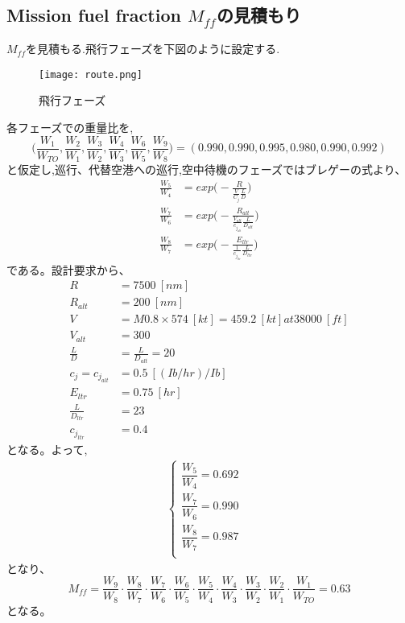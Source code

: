 \documentclass[../main]{subfiles}
\begin{document}
  \subsection{Mission fuel fraction $M_{ff}$の見積もり}
    $M_{ff}$を見積もる.飛行フェーズを下図のように設定する.
    \begin{figure}[H]
      \begin{center}
        \texttt{[image: route.png]}
        \caption{飛行フェーズ} %
        \label{route} %
      \end{center}
    \end{figure}
    各フェーズでの重量比を,
    \begin{equation}
      \biggl( \frac{W_1}{W_{TO}},\frac{W_2}{W_1},\frac{W_3}{W_2},\frac{W_4}{W_3},\frac{W_6}{W_5},\frac{W_9}{W_8} \biggr )
      = (0.990,0.990,0.995,0.980,0.990,0.992)
    \end{equation}
    と仮定し,巡行、代替空港への巡行,空中待機のフェーズではブレゲーの式より、
    \begin{align}
      \frac{W_5}{W_4} &= exp \biggl( -\frac{R}{\frac{V}{C_j}\frac{L}{D}} \biggr) \nonumber \\
      \frac{W_7}{W_6} &= exp \biggl( -\frac{R_{alt}}
      {\frac{V_{alt}}{c_{j_{alt}}} \frac{L}{D_{alt}} } \biggr)  \\
      \frac{W_8}{W_7} &= exp \biggl( -\frac{E_{ltr}}
      {\frac{1}{c_{j_{ltr}}} \frac{L}{D_{ltr}} } \biggr) \nonumber
    \end{align}
    である。設計要求から、
    \begin{align}
      R &= 7500 \ [nm] \nonumber \\
      R_{alt} &= 200 \ [nm] \nonumber \\
      V &= M 0.8 \times 574 \ [kt] = 459.2 \ [kt] at 38000 \ [ft] \nonumber \\
      V_{alt} &= 300 \nonumber \\
      \frac{L}{D} &= \frac{L}{D_{alt}} = 20  \\
      c_j = c_{j_{alt}} &= 0.5 \ [(Ib/hr)/Ib] \nonumber \\
      E_{ltr} &= 0.75 \ [hr] \nonumber \\
      \frac{L}{D_{ltr}} &= 23 \nonumber \\
      c_{j_{ltr}} &= 0.4 \nonumber
    \end{align}
    となる。よって,
    \begin{eqnarray}
      \begin{cases}
        \dfrac{W_5}{W_4} = 0.692  & \\[5mm]
        \dfrac{W_7}{W_6} = 0.990  & \\[5mm]
        \dfrac{W_8}{W_7} = 0.987 & \\
      \end{cases}
    \end{eqnarray}
    となり、
    \begin{equation}
      M_{ff} = \frac{W_9}{W_8} \cdot \frac{W_8}{W_7} \cdot \frac{W_7}{W_6} \cdot
      \frac{W_6}{W_5}  \cdot \frac{W_5}{W_4} \cdot \frac{W_4}{W_3}
      \cdot \frac{W_3}{W_2} \cdot \frac{W_2}{W_1} \cdot \frac{W_1}{W_{TO}} = 0.63
    \end{equation}
    となる。
\end{document}
